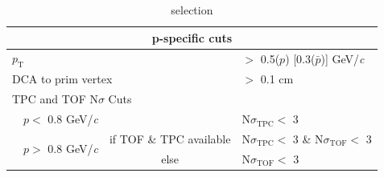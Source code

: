 \documentclass[/home/jesse/Analysis/FemtoAnalysis/AnalysisNotes/AnalysisNoteJBuxton.tex]{subfiles}
\begin{document}
\begin{table}[htbp]
\begin{tabular}{lc|c|l}
   
   \multicolumn{4}{c}{\textbf{p-specific cuts}} \\
   \hline
   \multicolumn{3}{l|}{$p_{\mathrm{T}}$} & $ > $ 0.5($p$) [0.3($\bar{p}$)] GeV/\textit{c} \\
   \hline
   \multicolumn{3}{l|}{DCA to prim vertex} & $>$ 0.1 cm \\
   \hline
   \multicolumn{4}{l}{TPC and TOF N$\sigma$ Cuts} \\
   \hline
    & \multicolumn{1}{c}{$p <$ 0.8 GeV/\textit{c}} & & N$\sigma_{\mathrm{TPC}} <$ 3 \\
   \hline
    & \multirow{2}{*}{$p >$ 0.8 GeV/\textit{c}} &  if TOF \& TPC available & N$\sigma_{\mathrm{TPC}} <$ 3 \& N$\sigma_{\mathrm{TOF}} <$ 3 \\
   \cline{3-4}
    & & else & N$\sigma_{\mathrm{TOF}} <$ 3 \\
   \hline   
  \end{tabular}
 \caption{\Lam selection}
 \label{tab:LamCuts} 
\end{table}
\end{document}

